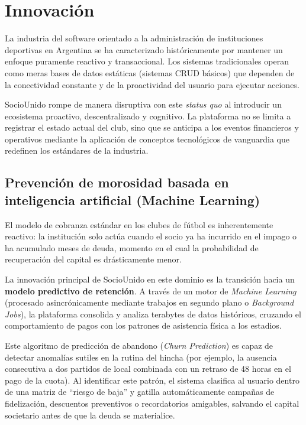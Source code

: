\section{Innovación}

La industria del software orientado a la administración de instituciones deportivas en Argentina se ha caracterizado históricamente por mantener un enfoque puramente reactivo y transaccional. Los sistemas tradicionales operan como meras bases de datos estáticas (sistemas CRUD básicos) que dependen de la conectividad constante y de la proactividad del usuario para ejecutar acciones. 

SocioUnido rompe de manera disruptiva con este \textit{status quo} al introducir un ecosistema proactivo, descentralizado y cognitivo. La plataforma no se limita a registrar el estado actual del club, sino que se anticipa a los eventos financieros y operativos mediante la aplicación de conceptos tecnológicos de vanguardia que redefinen los estándares de la industria.

\subsection{Prevención de morosidad basada en inteligencia artificial (Machine Learning)}

El modelo de cobranza estándar en los clubes de fútbol es inherentemente reactivo: la institución solo actúa cuando el socio ya ha incurrido en el impago o ha acumulado meses de deuda, momento en el cual la probabilidad de recuperación del capital es drásticamente menor. 

La innovación principal de SocioUnido en este dominio es la transición hacia un \textbf{modelo predictivo de retención}. A través de un motor de \textit{Machine Learning} (procesado asincrónicamente mediante trabajos en segundo plano o \textit{Background Jobs}), la plataforma consolida y analiza terabytes de datos históricos, cruzando el comportamiento de pagos con los patrones de asistencia física a los estadios. 

Este algoritmo de predicción de abandono (\textit{Churn Prediction}) es capaz de detectar anomalías sutiles en la rutina del hincha (por ejemplo, la ausencia consecutiva a dos partidos de local combinada con un retraso de 48 horas en el pago de la cuota). Al identificar este patrón, el sistema clasifica al usuario dentro de una matriz de ``riesgo de baja'' y gatilla automáticamente campañas de fidelización, descuentos preventivos o recordatorios amigables, salvando el capital societario antes de que la deuda se materialice.

